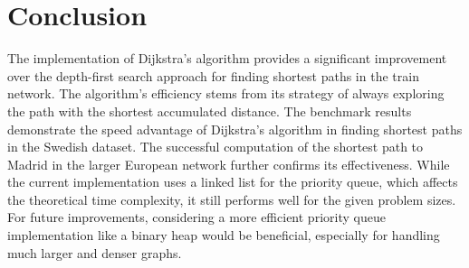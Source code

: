 \documentclass[a4paper,11pt]{article}
\begin{document}
\section*{Conclusion}
The implementation of Dijkstra's algorithm provides a significant improvement over the depth-first search approach for finding shortest paths in the train network. The algorithm's efficiency stems from its strategy of always exploring the path with the shortest accumulated distance. The benchmark results demonstrate the speed advantage of Dijkstra's algorithm in finding shortest paths in the Swedish dataset. The successful computation of the shortest path to Madrid in the larger European network further confirms its effectiveness. While the current implementation uses a linked list for the priority queue, which affects the theoretical time complexity, it still performs well for the given problem sizes. For future improvements, considering a more efficient priority queue implementation like a binary heap would be beneficial, especially for handling much larger and denser graphs.
\end{document}
